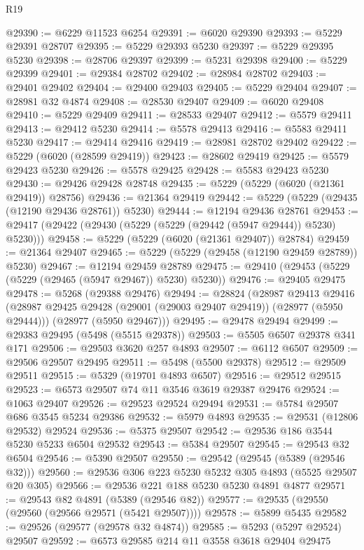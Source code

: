 \begin{lexlean}{R19}
\begin{coremodule}
@29390 := @6229 @11523 @6254
@29391 := @6020 @29390
@29393 := @5229 @29391 @28707
@29395 := @5229 @29393 @5230
@29397 := @5229 @29395 @5230
@29398 := @28706 @29397
@29399 := @5231 @29398
@29400 := @5229 @29399
@29401 := @29384 @28702
@29402 := @28984 @28702
@29403 := @29401 @29402
@29404 := @29400 @29403
@29405 := @5229 @29404
@29407 := @28981 @32 @4874
@29408 := @28530 @29407
@29409 := @6020 @29408
@29410 := @5229 @29409
@29411 := @28533 @29407
@29412 := @5579 @29411
@29413 := @29412 @5230
@29414 := @5578 @29413
@29416 := @5583 @29411 @5230
@29417 := @29414 @29416
@29419 := @28981 @28702 @29402
@29422 := @5229 (@6020 (@28599 @29419))
@29423 := @28602 @29419
@29425 := @5579 @29423 @5230
@29426 := @5578 @29425
@29428 := @5583 @29423 @5230
@29430 := @29426 @29428 @28748
@29435 := @5229 (@5229 (@6020 (@21361 @29419)) @28756)
@29436 := @21364 @29419
@29442 := @5229 (@5229 (@29435 (@12190 @29436 @28761)) @5230)
@29444 := @12194 @29436 @28761
@29453 := @29417 (@29422 (@29430 (@5229 (@5229 (@29442 (@5947 @29444)) @5230) @5230)))
@29458 := @5229 (@5229 (@6020 (@21361 @29407)) @28784)
@29459 := @21364 @29407
@29465 := @5229 (@5229 (@29458 (@12190 @29459 @28789)) @5230)
@29467 := @12194 @29459 @28789
@29475 := @29410 (@29453 (@5229 (@5229 (@29465 (@5947 @29467)) @5230) @5230))
@29476 := @29405 @29475
@29478 := @5268 (@29388 @29476)
@29494 := @28824
    (@28987
      @29413
      @29416
      (@28987 @29425 @29428 (@29001 (@29003 @29407 @29419)) (@28977 (@5950 @29444)))
      (@28977 (@5950 @29467)))
@29495 := @29478 @29494
@29499 := @29383 @29495 (@5498 (@5515 @29378))
@29503 := @5505 @6507 @29378 @341 @171
@29506 := @29503 @3620 @257 @4893
@29507 := @6112 @6507
@29509 := @29506 @29507 @29495
@29511 := @5498 (@5500 @29378)
@29512 := @29509 @29511
@29515 := @5329 (@19701 @4893 @6507)
@29516 := @29512 @29515
@29523 := @6573 @29507 @74 @11 @3546 @3619 @29387 @29476
@29524 := @1063 @29407
@29526 := @29523 @29524 @29494
@29531 := @5784 @29507 @686 @3545 @5234 @29386
@29532 := @5979 @4893
@29535 := @29531 (@12806 @29532) @29524
@29536 := @5375 @29507
@29542 := @29536 @186 @3544 @5230 @5233 @6504 @29532
@29543 := @5384 @29507
@29545 := @29543 @32 @6504
@29546 := @5390 @29507
@29550 := @29542 (@29545 (@5389 (@29546 @32)))
@29560 := @29536 @306 @223 @5230 @5232 @305 @4893 (@5525 @29507 @20 @305)
@29566 := @29536 @221 @188 @5230 @5230 @4891 @4877
@29571 := @29543 @82 @4891 (@5389 (@29546 @82))
@29577 := @29535 (@29550 (@29560 (@29566 @29571 (@5421 @29507))))
@29578 := @5899 @5435
@29582 := @29526 (@29577 (@29578 @32 @4874))
@29585 := @5293 (@5297 @29524) @29507
@29592 := @6573 @29585 @214 @11 @3558 @3618 @29404 @29475

\end{coremodule}
\end{lexlean}

